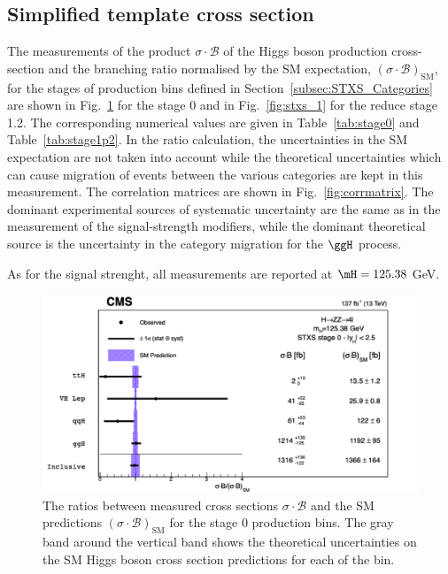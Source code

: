 \subsection{Simplified template cross section}
\label{subsec:stxs}

The measurements of the product $\sigma\cdot\mathcal{B}$ of the Higgs boson production cross-section and the branching ratio normalised by the SM expectation,
$(\sigma\cdot\mathcal{B})_{\mathrm{SM}}$, for the stages of production bins defined in Section~\ref{subsec:STXS_Categories} are shown in Fig.~\ref{fig:stxs_0} for the stage 0 and in Fig.~\ref{fig:stxs_1} for the reduce stage 1.2.
The corresponding numerical values are given in Table~\ref{tab:stage0} and Table~\ref{tab:stage1p2}.
In the ratio calculation, the uncertainties in the SM expectation are not taken into account while the theoretical uncertainties which can cause migration of events between the various categories are kept in this measurement.
The correlation matrices are shown in Fig.~\ref{fig:corrmatrix}.
The dominant experimental sources of systematic uncertainty are the same as in the measurement of the signal-strength modifiers, while the dominant theoretical source is the uncertainty in the category migration for the $\ggH$ process.

As for the signal strenght, all measurements are reported at $\mH=125.38$ GeV.%

\begin{figure}[!htb]
\begin{center}
\includegraphics[width=0.7\linewidth]{Figures/results/stxs/stage0_125_38.pdf}
\caption{
		The ratios between measured cross sections $\sigma\cdot\mathcal{B}$ and the SM predictions $(\sigma\cdot\mathcal{B})_{\mathrm{SM}}$ for the stage 0 production bins.%
		The gray band around the vertical band shows the theoretical uncertainties on the SM Higgs boson cross section predictions for each of the bin.
			\label{fig:stxs_0}
			}
	\end{center}
\end{figure}

